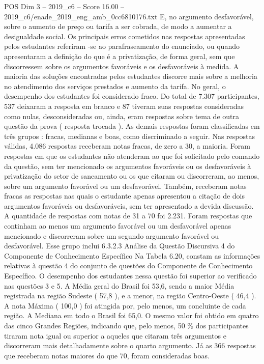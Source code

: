 \begin{textsample}{POS Dim 3 – 2019\_c6 – Score 16.00 – 2019\_c6/enade\_2019\_eng\_amb\_0cc6810176.txt}
E, no argumento desfavorável, sobre o aumento de preço ou tarifa a ser cobrada, de modo a aumentar a desigualdade social.
Os principais erros cometidos nas respostas apresentadas pelos estudantes referiram -se ao parafraseamento do enunciado, ou quando apresentaram a definição do que é a privatização, de forma geral, sem que discorressem sobre os argumentos favoráveis e os desfavoráveis à medida.
A maioria das soluções encontradas pelos estudantes discorre mais sobre a melhoria no atendimento dos serviços prestados e aumento da tarifa.
No geral, o desempenho dos estudantes foi considerado fraco.
Do total de 7.307 participantes, 537 deixaram a resposta em branco e 87 tiveram suas respostas consideradas como nulas, desconsideradas ou, ainda, eram respostas sobre tema de outra questão da prova ( resposta trocada ).
As demais respostas foram classificadas em três grupos : fracas, medianas e boas, como discriminado a seguir.
Nas respostas válidas, 4.086 respostas receberam notas fracas, de zero a 30, a maioria.
Foram respostas em que os estudantes não atenderam ao que foi solicitado pelo comando da questão, sem ter mencionado os argumentos favoráveis ou os desfavoráveis à privatização do setor de saneamento ou os que citaram ou discorreram, ao menos, sobre um argumento favorável ou um desfavorável.
Também, receberam notas fracas as respostas nas quais o estudante apenas apresentou a citação de dois argumentos favoráveis ou desfavoráveis, sem ter apresentado a devida discussão.
A quantidade de respostas com notas de 31 a 70 foi 2.231.
Foram respostas que continham ao menos um argumento favorável ou um desfavorável apenas mencionado e discorreram sobre um segundo argumento favorável ou desfavorável.
Esse grupo inclui 6.3.2.3 Análise da Questão Discursiva 4 do Componente de Conhecimento Específico Na Tabela 6.20, constam as informações relativas à questão 4 do conjunto de questões do Componente de Conhecimento Específico.
O desempenho dos estudantes nessa questão foi superior ao verificado nas questões 3 e 5.
A Média geral do Brasil foi 53,6, sendo a maior Média registrada na região Sudeste ( 57,8 ), e a menor, na região Centro-Oeste ( 46,4 ).
A nota Máxima ( 100,0 ) foi atingida por, pelo menos, um concluinte de cada região.
A Mediana em todo o Brasil foi 65,0.
O mesmo valor foi obtido em quatro das cinco Grandes Regiões, indicando que, pelo menos, 50 \% dos participantes tiraram nota igual ou superior a aqueles que citaram três argumentos e discorreram mais detalhadamente sobre o quarto argumento.
Já as 366 respostas que receberam notas maiores do que 70, foram consideradas boas.

\end{textsample}
